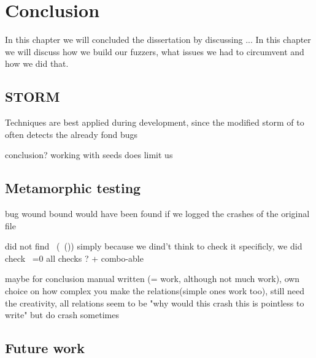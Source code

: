 \chapter{Conclusion}
\label{cha:conclusion}
\label{con:intro}
In this chapter we will concluded the dissertation by discussing ...
In this chapter we will discuss how we build our fuzzers, what issues we had to circumvent and how we did that. 




\section{STORM}
Techniques are best applied during development, since the modified storm of to often detects the already fond bugs

conclusion? 
working with seeds does limit us



\section{Metamorphic testing}
bug wound bound would have been found if we logged the crashes of the original file 

did not find ~(~()) simply because we dind't think to check it specificly, we did check ~=0
all checks ? + combo-able

maybe for conclusion
manual written (= work, although not much work), own choice on how complex you make the relations(simple ones work too), still need the creativity, all relations seem to be "why would this crash this is pointless to write" but do crash sometimes


\section{Future work}





